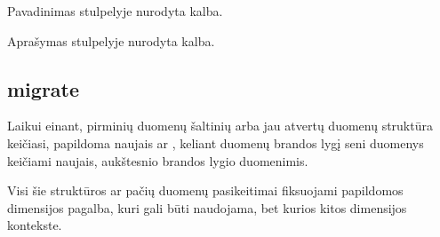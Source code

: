 \documentclass[letterpaper,10pt,lithuanian]{sphinxmanual}
\begin{document}

\begin{fulllineitems}
\label{\detokenize{dimensijos:lang.title}}
\pysigstartsignatures
{}
\pysigstopsignatures
\sphinxAtStartPar
Pavadinimas {\hyperref[\detokenize{dimensijos:lang.ref}]{}} stulpelyje nurodyta kalba.

\end{fulllineitems}


\begin{fulllineitems}
\label{\detokenize{dimensijos:lang.description}}
\pysigstartsignatures
{}
\pysigstopsignatures
\sphinxAtStartPar
Aprašymas {\hyperref[\detokenize{dimensijos:lang.ref}]{}} stulpelyje nurodyta kalba.

\end{fulllineitems}



\subsection{migrate}
\label{\detokenize{dimensijos:migrate}}\label{\detokenize{dimensijos:id16}}\label{\detokenize{dimensijos:module-migrate}}
\sphinxAtStartPar
{}

\sphinxAtStartPar
Laikui einant, pirminių duomenų šaltinių arba jau atvertų duomenų struktūra
keičiasi, papildoma naujais {\hyperref[\detokenize{savokos:term-modelis}]{}} ar {\hyperref[\detokenize{savokos:term-savybe}]{}}, keliant duomenų brandos lygį seni duomenys keičiami naujais,
aukštesnio brandos lygio duomenimis.

\sphinxAtStartPar
Visi šie struktūros ar pačių duomenų pasikeitimai fiksuojami papildomos
{\hyperref[\detokenize{dimensijos:module-migrate}]{}} dimensijos pagalba, kuri gali būti naudojama, bet kurios kitos
dimensijos kontekste.
\end{document}
